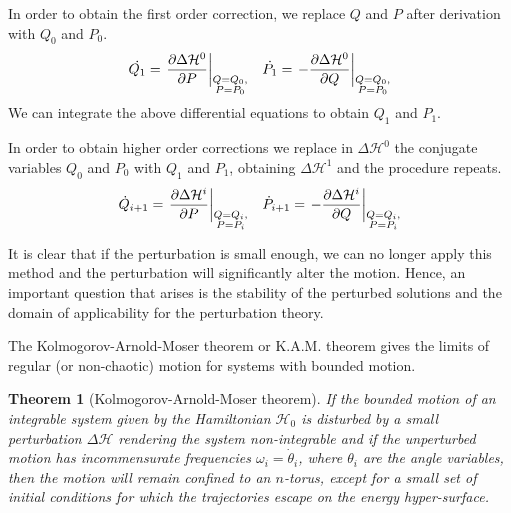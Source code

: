 \documentclass[../thesis.tex]{subfiles}
\theoremstyle{plain}
\newtheorem*{theorem*}{Theorem}
\begin{document}
In order to obtain the first order correction, we replace \(Q\) and \(P\)
after derivation with \(Q_0\) and \(P_0\).
\begin{align*}
  \dot{Q_1} = \eval{\pdv{\Delta \mathcal{H}^0}{P}}_{\substack{Q=Q_0,\\P=P_0}} &&
  \dot{P_1} = \eval{-\pdv{\Delta \mathcal{H}^0}{Q}}_{\substack{Q=Q_0,\\P=P_0}}
\end{align*}
We can integrate the above differential equations to obtain \(Q_1\) and \(P_1\).


In order to obtain higher order corrections we replace in \(\Delta \mathcal{H}^0\)
the conjugate variables \(Q_0\) and \(P_0\) with \(Q_1\) and \(P_1\),
obtaining \(\Delta \mathcal{H}^1\) and the procedure repeats.
\begin{align*}
  \dot{Q}_{i+1} = \eval{\pdv{\Delta \mathcal{H}^i}{P}}_{\substack{Q=Q_i,\\P=P_i}} &&
  \dot{P}_{i+1} = \eval{-\pdv{\Delta \mathcal{H}^i}{Q}}_{\substack{Q=Q_i,\\P=P_i}}
\end{align*}

It is clear that if the perturbation is small enough, we can no longer apply
this method and the perturbation will significantly alter the motion.
Hence, an important question that arises is the stability of the perturbed solutions
and the domain of applicability for the perturbation theory.

The Kolmogorov-Arnold-Moser theorem or K.A.M. theorem gives the limits of regular (or
non-chaotic) motion for systems with bounded motion.


\begin{theorem*}[Kolmogorov-Arnold-Moser theorem]
  If the bounded motion of an integrable system given by the Hamiltonian \(\mathcal{H}_0\)
  is disturbed by a small perturbation \(\Delta \mathcal{H}\) rendering the system
  non-integrable and if the unperturbed motion has incommensurate
  frequencies \(\omega_i=\dot{\theta}_i\), where \(\theta_i\) are the angle
  variables, then the motion will remain confined to an \(n\)-torus, except for
  a small set of initial conditions for which the trajectories escape on the
  energy hyper-surface.
\end{theorem*}
\end{document}
